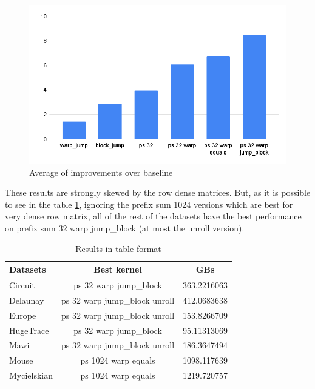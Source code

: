 \documentclass[conference]{IEEEtran}
\begin{document}
\begin{figure}[hbt!]
	\centering
	\includegraphics[width=1\linewidth]{data_images/overall}
	\caption{Average of improvements over baseline}
	\label{fig:overall}
\end{figure}

These results are strongly skewed by the row dense matrices. But, as it is possible to see in the table \ref{tab:best_kernels}, ignoring the prefix sum 1024 versions which are best for very dense row matrix, all of the rest of the datasets have the best performance on prefix sum 32 warp jump\_block (at most the unroll version).

\begin{table}[h!]
	\centering
	\begin{adjustbox}{width=0.9\columnwidth}
		\begin{tabular}{lcc}
			\toprule
			\textbf{Datasets} & \textbf{Best kernel} & \textbf{GBs} \\
			\midrule
	        Circuit & ps 32 warp jump\_block & 363.2216063 \\
			Delaunay & ps 32 warp  jump\_block unroll & 412.0683638 \\
			Europe & ps 32 warp  jump\_block unroll & 153.8266709 \\
			HugeTrace & ps 32 warp jump\_block & 95.11313069 \\
			Mawi & ps 32 warp  jump\_block unroll & 186.3647494 \\
			Mouse & ps 1024 warp equals & 1098.117639 \\
			Mycielskian & ps 1024 warp equals & 1219.720757 \\
		\end{tabular}
	\end{adjustbox}

	\caption{Results in table format}
	\label{tab:best_kernels}
\end{table}
\end{document}
